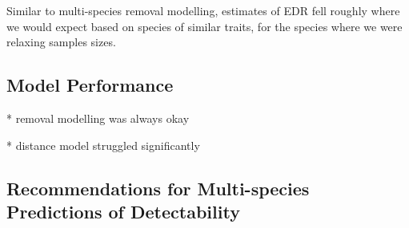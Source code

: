 \documentclass[12pt]{article}
\begin{document}
\par Similar to multi-species removal modelling, estimates of EDR fell roughly where we would expect based on species of similar traits, for the species where we were relaxing samples sizes.

\subsection{Model Performance}

* removal modelling was always okay

* distance model struggled significantly

\subsection{Recommendations for Multi-species Predictions of Detectability}



\end{document}
